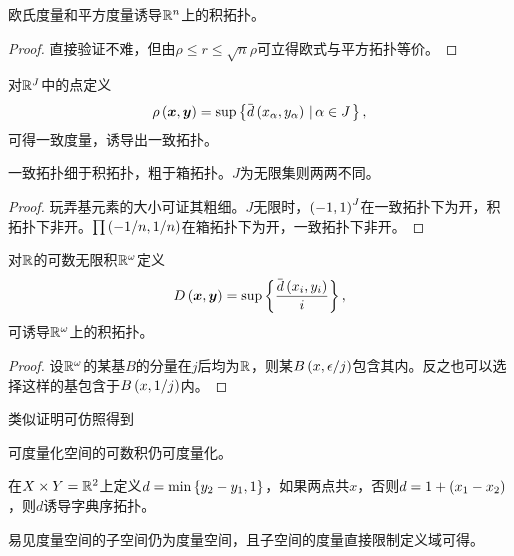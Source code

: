 \documentclass{ctexrep}
\begin{document}
  \begin{theorem}
    欧氏度量和平方度量诱导$\mathbb{R}^n$上的积拓扑。
  \end{theorem}
  \begin{proof}
    直接验证不难，但由$\rho \le r \le \sqrt{n} \rho$可立得欧式与平方拓扑等价。
  \end{proof}
  \begin{definition}
    对$\mathbb{R}^J$中的点定义
    \[ \rho\pare{\vx,\vy} = \sup\setcond{\sbm{d}\pare{x_\alpha,y_\alpha}}{\alpha\in J}, \]
    可得一致度量，诱导出一致拓扑。
  \end{definition}
  \begin{theorem}
    一致拓扑细于积拓扑，粗于箱拓扑。$J$为无限集则两两不同。
  \end{theorem}
  \begin{proof}
    玩弄基元素的大小可证其粗细。$J$无限时，$\left(-1,1\right)^J$在一致拓扑下为开，积拓扑下非开。$\prod \left(-1/n,1/n\right)$在箱拓扑下为开，一致拓扑下非开。
  \end{proof}
  \begin{theorem}
    对$\mathbb{R}$的可数无限积$\mathbb{R}^\omega$定义
    \[ D\pare{\vx, \vy} = \sup\curb{\frac{\sbm{d}\pare{x_i,y_i}}{i}}, \]
    可诱导$\mathbb{R}^\omega$上的积拓扑。
  \end{theorem}
  \begin{proof}
    设$\mathbb{R}^\omega$的某基$B$的分量在$j$后均为$\mathbb{R}$，则某$B\left(x, \epsilon/j\right)$包含其内。反之也可以选择这样的基包含于$B\left(x, 1/j\right)$内。
  \end{proof}
  类似证明可仿照得到
  \begin{theorem}
    可度量化空间的可数积仍可度量化。
  \end{theorem}
  \begin{ex}
    在$X\times Y=\mathbb{R}^2$上定义$d=\min\left\{y_2-y_1,1\right\}$，如果两点共$x$，否则$d = 1+\left(x_1-x_2\right)$，则$d$诱导字典序拓扑。
  \end{ex}
  \begin{ex}
    易见度量空间的子空间仍为度量空间，且子空间的度量直接限制定义域可得。
  \end{ex}
\end{document}
